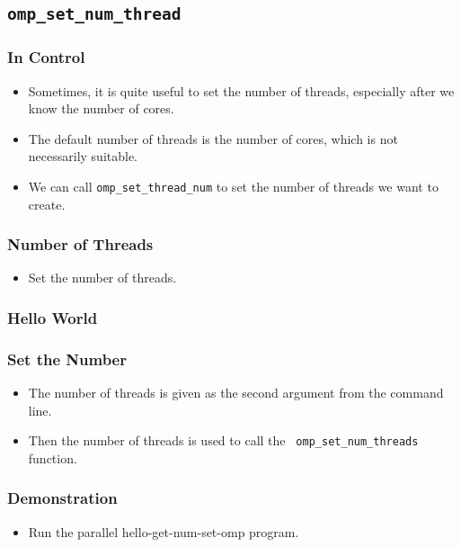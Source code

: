 \documentclass{beamer}
\begin{document}
\subsection{\tt omp\_set\_num\_thread}

\begin{frame}
\frametitle{In Control}
\begin{itemize}
\item Sometimes, it is quite useful to set the number of threads,
  especially after we know the number of cores.
\item The default number of threads is the number of cores, which is
  not necessarily suitable.
\item We can call {\tt omp\_set\_thread\_num} to set the number of
  threads we want to create.
\end{itemize}
\end{frame}


\begin{frame}
\frametitle{Number of Threads}
\begin{itemize}
\item Set the number of threads.
\end{itemize}
\end{frame}


\begin{frame}
\frametitle{Hello World}
\end{frame}

\begin{frame}
\frametitle{Set the Number}
\begin{itemize}
\item The number of threads is given as the second argument from the
  command line.
\item Then the number of threads is used to call the {\tt
  omp\_set\_num\_threads} function.
\end{itemize}
\end{frame}

\begin{frame}
\frametitle{Demonstration}
\begin{itemize}
\item Run the parallel hello-get-num-set-omp program.
\end{itemize}
\end{frame}
\end{document}
